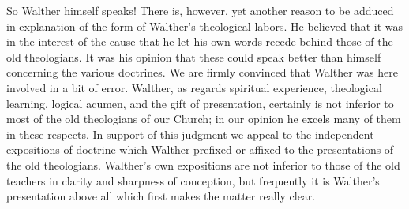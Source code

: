                 So Walther himself speaks!  There is, however, yet another reason to be adduced in explanation of the form of Walther’s theological labors.  He believed that it was in the interest of the cause that he let his own words recede behind those of the old theologians.  It was his opinion that these could speak better than himself concerning the various doctrines.  We are firmly convinced that Walther was here involved in a bit of error.  Walther, as regards spiritual experience, theological learning, logical acumen, and the gift of presentation, certainly is not inferior to most of the old theologians of our Church; in our opinion he excels many of them in these respects.  In support of this judgment we appeal to the independent expositions of doctrine which Walther prefixed or affixed to the presentations of the old theologians.  Walther’s own expositions are not inferior to those of the old teachers in clarity and sharpness of conception, but frequently it is Walther’s presentation above all which first makes the matter really clear.

